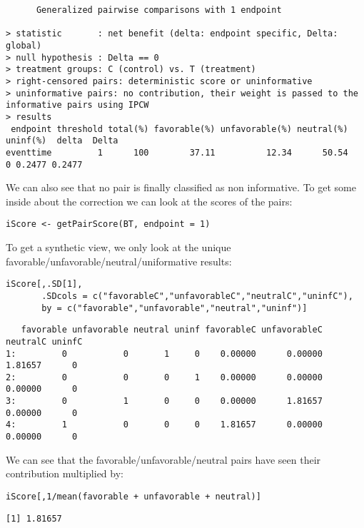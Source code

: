 \documentclass[12pt]{article}
\begin{document}
\begin{verbatim}
      Generalized pairwise comparisons with 1 endpoint

> statistic       : net benefit (delta: endpoint specific, Delta: global) 
> null hypothesis : Delta == 0 
> treatment groups: C (control) vs. T (treatment) 
> right-censored pairs: deterministic score or uninformative
> uninformative pairs: no contribution, their weight is passed to the informative pairs using IPCW
> results
 endpoint threshold total(%) favorable(%) unfavorable(%) neutral(%) uninf(%)  delta  Delta
eventtime         1      100        37.11          12.34      50.54        0 0.2477 0.2477
\end{verbatim}


We can also see that no pair is finally classified as non
informative. To get some inside about the correction we can look at
the scores of the pairs:
\lstset{language=r,label= ,caption= ,captionpos=b,numbers=none}
\begin{lstlisting}
iScore <- getPairScore(BT, endpoint = 1)
\end{lstlisting}

To get a synthetic view, we only look at the unique
favorable/unfavorable/neutral/uniformative results:
\lstset{language=r,label= ,caption= ,captionpos=b,numbers=none}
\begin{lstlisting}
iScore[,.SD[1], 
	   .SDcols = c("favorableC","unfavorableC","neutralC","uninfC"),
	   by = c("favorable","unfavorable","neutral","uninf")]
\end{lstlisting}

\begin{verbatim}
   favorable unfavorable neutral uninf favorableC unfavorableC neutralC uninfC
1:         0           0       1     0    0.00000      0.00000  1.81657      0
2:         0           0       0     1    0.00000      0.00000  0.00000      0
3:         0           1       0     0    0.00000      1.81657  0.00000      0
4:         1           0       0     0    1.81657      0.00000  0.00000      0
\end{verbatim}

We can see that the favorable/unfavorable/neutral pairs have seen
their contribution multiplied by:
\lstset{language=r,label= ,caption= ,captionpos=b,numbers=none}
\begin{lstlisting}
iScore[,1/mean(favorable + unfavorable + neutral)]
\end{lstlisting}

\begin{verbatim}
[1] 1.81657
\end{verbatim}
\end{document}
